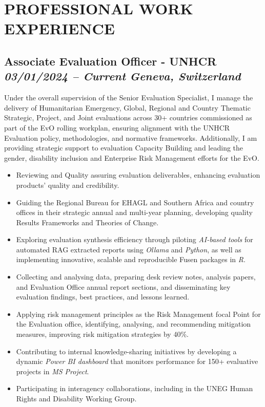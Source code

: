 \documentclass[
  10pt,
]{article}
\providecommand{\tightlist}{%
  \setlength{\itemsep}{0pt}\setlength{\parskip}{0pt}}
\begin{document}
\vspace{0.5cm}

\section{PROFESSIONAL WORK EXPERIENCE}\label{work-experience}

\subsection{\texorpdfstring{Associate Evaluation Officer - UNHCR
\emph{03/01/2024 -- Current} \textbar{} \emph{Geneva, Switzerland}}{Associate Evaluation Officer - UNHCR 03/01/2024 -- Current \textbar{} Geneva, Switzerland}}\label{associate-evaluation-officer---unhcr-03012024-current-geneva-switzerland}

Under the overall supervision of the Senior Evaluation Specialist, I manage the delivery of Humanitarian Emergency, Global, Regional and Country Thematic Strategic, Project, and Joint evaluations across 30+ countries commissioned as part of the EvO rolling workplan, ensuring alignment with the UNHCR Evaluation policy, methodologies, and normative frameworks. Additionally, I am providing strategic support to evaluation Capacity Building and leading the gender, disability inclusion and Enterprise Risk Management efforts for the EvO.

\begin{itemize}
\tightlist
\item
Reviewing and Quality assuring evaluation deliverables, enhancing evaluation products' quality and credibility.
\item
Guiding the Regional Bureau for EHAGL and Southern Africa and country offices in their strategic annual and multi-year planning, developing quality Results Frameworks and Theories of Change.
\item
Exploring evaluation synthesis efficiency through piloting \emph{AI-based tools} for automated RAG extracted reports using \emph{Ollama} and \emph{Python}, as well as implementing innovative, scalable and reproducible Fusen packages in \emph{R}.
\item
Collecting and analysing data, preparing desk review notes, analysis papers, and Evaluation Office annual report sections, and disseminating key evaluation findings, best practices, and lessons learned.
\item
Applying risk management principles as the Risk Management focal Point for the Evaluation office, identifying, analysing, and recommending mitigation measures, improving risk mitigation strategies by 40\%.
\item
Contributing to internal knowledge-sharing initiatives by developing a dynamic \emph{Power BI dashboard} that monitors performance for 150+ evaluative projects in \emph{MS Project}.
\item
Participating in interagency collaborations, including in the UNEG Human Rights and Disability Working Group.
\end{itemize}
\end{document}

